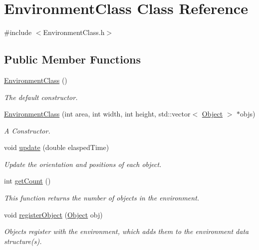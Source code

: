 \hypertarget{classEnvironmentClass}{\section{Environment\-Class Class Reference}
\label{classEnvironmentClass}
}


{\ttfamily \#include $<$Environment\-Class.\-h$>$}

\subsection*{Public Member Functions}
\begin{DoxyCompactItemize}
\item 
\hyperlink{classEnvironmentClass_aa69ad01551a79f7326f005709061ff31}{Environment\-Class} ()
\begin{DoxyCompactList}\small\item\em The default constructor. \end{DoxyCompactList}\item 
\hyperlink{classEnvironmentClass_a48da88b6cf7894159825b9c869b2af9f}{Environment\-Class} (int area, int width, int height, std\-::vector$<$ \hyperlink{classObject}{Object} $>$ $\ast$objs)
\begin{DoxyCompactList}\small\item\em A Constructor. \end{DoxyCompactList}\item 
void \hyperlink{classEnvironmentClass_afd86169390f7e3aadfb7b6438d220655}{update} (double elasped\-Time)
\begin{DoxyCompactList}\small\item\em Update the orientation and positions of each object. \end{DoxyCompactList}\item 
int \hyperlink{classEnvironmentClass_a77e1650c9944e5831760b4f9a9482580}{get\-Count} ()
\begin{DoxyCompactList}\small\item\em This function returns the number of objects in the environment. \end{DoxyCompactList}\item 
void \hyperlink{classEnvironmentClass_ac4de88a208dfe69c635eb1aa1954fc60}{register\-Object} (\hyperlink{classObject}{Object} obj)
\begin{DoxyCompactList}\small\item\em Objects register with the environment, which adds them to the environment data structure(s). \end{DoxyCompactList}\item 

\end{DoxyCompactItemize}
